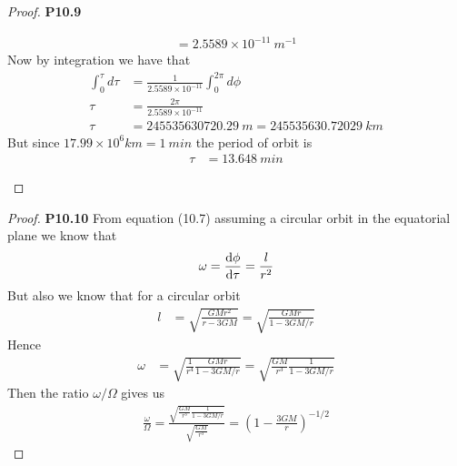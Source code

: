 \documentclass[11pt]{article}
\theoremstyle{definition}
\begin{document}
\begin{proof}{\textbf{P10.9}}
\begin{itemize}
\begin{align*}
            = 2.5589 \times 10^{-11}~m^{-1}
        \end{align*}
        Now by integration we have that
        \begin{align*}
            \int_0^\tau d\tau &= \frac{1}{2.5589 \times 10^{-11}} \int_0^{2\pi} d\phi\\
            \tau &= \frac{2\pi}{2.5589 \times 10^{-11}}\\
            \tau &= 245535630720.29~m = 245535630.72029~km
        \end{align*}
        But since $17.99 \times 10^6 km = 1~min$ the period of orbit is
        \begin{align*}
            \tau &= 13.648~min
        \end{align*}
    \end{itemize}
\end{proof}
\begin{proof}{\textbf{P10.10}}
    From equation (10.7) assuming a circular orbit in the equatorial plane
    we know that
    \begin{align*}
        \omega = \dv{\phi}{\tau} = \frac{l}{r^2}
    \end{align*}
    But also we know that for a circular orbit
    \begin{align*}
        l &= \sqrt{\frac{GMr^2}{r - 3GM}} = \sqrt{\frac{GMr}{1 - 3GM/r}}
    \end{align*}
    Hence
    \begin{align*}
        \omega &= \sqrt{\frac{1}{r^4}\frac{GMr}{1 - 3GM/r}}
        = \sqrt{\frac{GM}{r^3}\frac{1}{1 - 3GM/r}}
    \end{align*}
    Then the ratio $\omega/\Omega$ gives us
    \begin{align*}
        \frac{\omega}{\Omega}
        = \frac{\sqrt{\frac{GM}{r^3}\frac{1}{1 - 3GM/r}}}{\sqrt{\frac{GM}{r^3}}}
        = \left(1 - \frac{3GM}{r}\right)^{-1/2}
    \end{align*}
\end{proof}
\cleardoublepage
\end{document}
